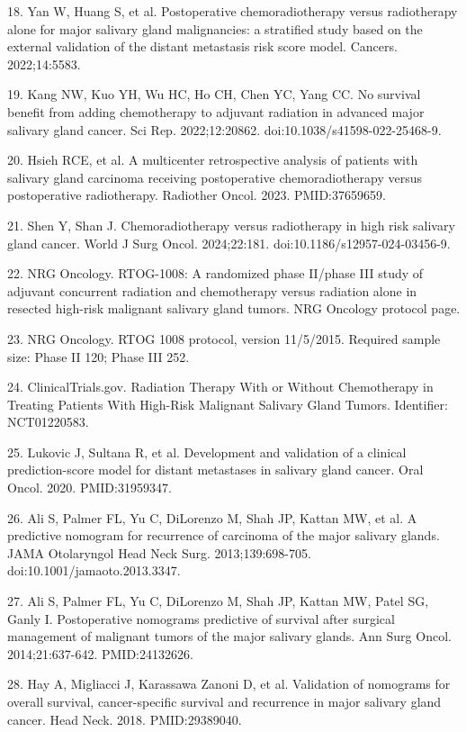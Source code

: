 \documentclass[10pt,twocolumn]{article}
\begin{document}
18. Yan W, Huang S, et al. Postoperative chemoradiotherapy versus radiotherapy alone for major salivary gland malignancies: a stratified study based on the external validation of the distant metastasis risk score model. Cancers. 2022;14:5583.\par
19. Kang NW, Kuo YH, Wu HC, Ho CH, Chen YC, Yang CC. No survival benefit from adding chemotherapy to adjuvant radiation in advanced major salivary gland cancer. Sci Rep. 2022;12:20862. doi:10.1038/s41598-022-25468-9.\par
20. Hsieh RCE, et al. A multicenter retrospective analysis of patients with salivary gland carcinoma receiving postoperative chemoradiotherapy versus postoperative radiotherapy. Radiother Oncol. 2023. PMID:37659659.\par
21. Shen Y, Shan J. Chemoradiotherapy versus radiotherapy in high risk salivary gland cancer. World J Surg Oncol. 2024;22:181. doi:10.1186/s12957-024-03456-9.\par
22. NRG Oncology. RTOG-1008: A randomized phase II/phase III study of adjuvant concurrent radiation and chemotherapy versus radiation alone in resected high-risk malignant salivary gland tumors. NRG Oncology protocol page.\par
23. NRG Oncology. RTOG 1008 protocol, version 11/5/2015. Required sample size: Phase II 120; Phase III 252.\par
24. ClinicalTrials.gov. Radiation Therapy With or Without Chemotherapy in Treating Patients With High-Risk Malignant Salivary Gland Tumors. Identifier: NCT01220583.\par
25. Lukovic J, Sultana R, et al. Development and validation of a clinical prediction-score model for distant metastases in salivary gland cancer. Oral Oncol. 2020. PMID:31959347.\par
26. Ali S, Palmer FL, Yu C, DiLorenzo M, Shah JP, Kattan MW, et al. A predictive nomogram for recurrence of carcinoma of the major salivary glands. JAMA Otolaryngol Head Neck Surg. 2013;139:698-705. doi:10.1001/jamaoto.2013.3347.\par
27. Ali S, Palmer FL, Yu C, DiLorenzo M, Shah JP, Kattan MW, Patel SG, Ganly I. Postoperative nomograms predictive of survival after surgical management of malignant tumors of the major salivary glands. Ann Surg Oncol. 2014;21:637-642. PMID:24132626.\par
28. Hay A, Migliacci J, Karassawa Zanoni D, et al. Validation of nomograms for overall survival, cancer-specific survival and recurrence in major salivary gland cancer. Head Neck. 2018. PMID:29389040.\par
\end{document}
